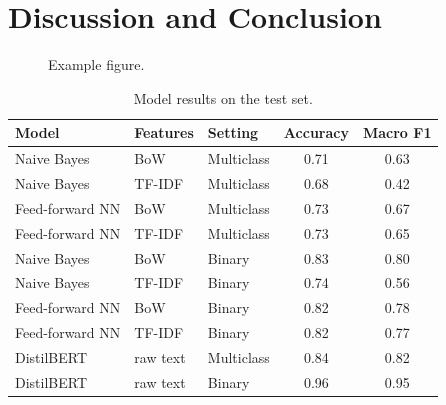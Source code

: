 \documentclass[sigconf,nonacm]{acmart}
\begin{document}
\section{Discussion and Conclusion}

\begin{figure}[h]
  \centering
  \caption{Example figure.}
\end{figure}

\begin{table}[h]
  \caption{Model results on the test set.}
  \label{tab:results}
  \begin{tabular}{lllcc}
    \toprule
    Model & Features & Setting & Accuracy & Macro F1 \\
    \midrule
    Naive Bayes & BoW & Multiclass & 0.71 & 0.63 \\
    Naive Bayes & TF-IDF & Multiclass & 0.68 & 0.42 \\
    Feed-forward NN & BoW & Multiclass & 0.73 & 0.67 \\
    Feed-forward NN & TF-IDF & Multiclass & 0.73 & 0.65 \\
    Naive Bayes & BoW & Binary & 0.83 & 0.80 \\
    Naive Bayes & TF-IDF & Binary & 0.74 & 0.56 \\
    Feed-forward NN & BoW & Binary & 0.82 & 0.78 \\
    Feed-forward NN & TF-IDF & Binary & 0.82 & 0.77 \\
    DistilBERT & raw text & Multiclass & 0.84 & 0.82 \\
    DistilBERT & raw text & Binary & 0.96 & 0.95 \\
    \bottomrule
  \end{tabular}
\end{table}



\end{document}
